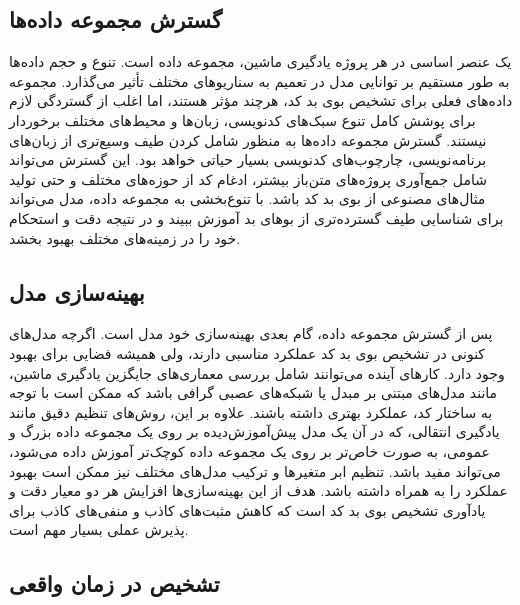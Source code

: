 \subsection{گسترش مجموعه داده‌ها}
یک عنصر اساسی در هر پروژه یادگیری ماشین، مجموعه داده است. تنوع و حجم داده‌ها به طور مستقیم بر توانایی مدل در تعمیم به سناریوهای مختلف تأثیر می‌گذارد. مجموعه داده‌های فعلی برای تشخیص بوی بد کد، هرچند مؤثر هستند، اما اغلب از گستردگی لازم برای پوشش کامل تنوع سبک‌های کدنویسی، زبان‌ها و محیط‌های مختلف برخوردار نیستند. گسترش مجموعه داده‌ها به منظور شامل کردن طیف وسیع‌تری از زبان‌های برنامه‌نویسی، چارچوب‌های کدنویسی بسیار حیاتی خواهد بود. این گسترش می‌تواند شامل جمع‌آوری پروژه‌های متن‌باز بیشتر، ادغام کد از حوزه‌های مختلف و حتی تولید مثال‌های مصنوعی از بوی بد کد باشد. با تنوع‌بخشی به مجموعه داده، مدل می‌تواند برای شناسایی طیف گسترده‌تری از بوهای بد آموزش ببیند و در نتیجه دقت و استحکام خود را در زمینه‌های مختلف بهبود بخشد.

\subsection{بهینه‌سازی مدل}

پس از گسترش مجموعه داده، گام بعدی بهینه‌سازی خود مدل است. اگرچه مدل‌های کنونی در تشخیص بوی بد کد عملکرد مناسبی دارند، ولی همیشه فضایی برای بهبود وجود دارد. کارهای آینده می‌توانند شامل بررسی معماری‌های جایگزین یادگیری ماشین، مانند مدل‌های مبتنی بر مبدل یا شبکه‌های عصبی گرافی باشد که ممکن است با توجه به ساختار کد، عملکرد بهتری داشته باشند. علاوه بر این، روش‌های تنظیم دقیق مانند یادگیری انتقالی، که در آن یک مدل پیش‌آموزش‌دیده بر روی یک مجموعه داده بزرگ و عمومی، به صورت خاص‌تر بر روی یک مجموعه داده کوچک‌تر آموزش داده می‌شود، می‌تواند مفید باشد. تنظیم ابر متغیرها و ترکیب مدل‌های مختلف نیز ممکن است بهبود عملکرد را به همراه داشته باشد. هدف از این بهینه‌سازی‌ها افزایش هر دو معیار دقت و یادآوری تشخیص بوی بد کد است که کاهش مثبت‌های کاذب و منفی‌های کاذب برای پذیرش عملی بسیار مهم است.

\subsection{تشخیص در زمان واقعی}

